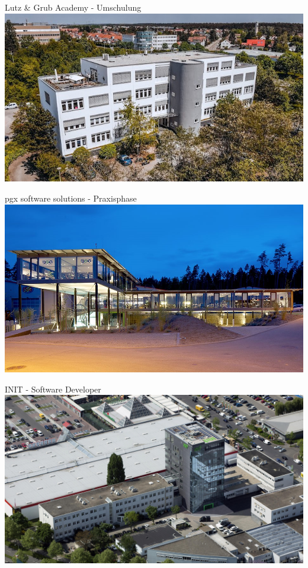 \documentclass[UKenglish,aspectratio=169]{beamer}
\begin{document}
\begin{frame}{Lutz \& Grub Academy - Umschulung}
  \centering
    \includegraphics[width=\linewidth,height=\dimexpr\textheight\relax,keepaspectratio]{UiB-images/lug.jpg}
\end{frame}

\begin{frame}{pgx software solutions - Praxisphase}
  \centering
    \includegraphics[width=\linewidth,height=\dimexpr\textheight\relax,keepaspectratio]{UiB-images/pgx.jpg}
\end{frame}

\begin{frame}{INIT - Software Developer}
  \centering
    \includegraphics[width=\linewidth,height=\dimexpr\textheight\relax,keepaspectratio]{UiB-images/init.jpg}
\end{frame}
\end{document}
